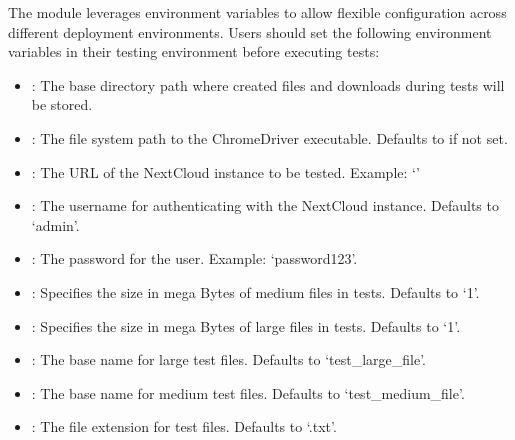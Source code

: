 \documentclass[letterpaper,10pt,english]{sphinxmanual}
\begin{document}
\begin{description}
\sphinxAtStartPar
The module leverages environment variables to allow flexible configuration across different deployment environments.
Users should set the following environment variables in their testing environment before executing tests:
\begin{itemize}
\item {} 
\sphinxAtStartPar
{}: The base directory path where created files and downloads during tests will be stored.

\item {} 
\sphinxAtStartPar
{}: The file system path to the ChromeDriver executable. Defaults to  if not set.

\item {} 
\sphinxAtStartPar
{}: The URL of the NextCloud instance to be tested. Example: ‘’

\item {} 
\sphinxAtStartPar
{}: The username for authenticating with the NextCloud instance. Defaults to ‘admin’.

\item {} 
\sphinxAtStartPar
{}: The password for the user. Example: ‘password123’.

\item {} 
\sphinxAtStartPar
{}: Specifies the size in mega Bytes of medium files in tests. Defaults to ‘1’.

\item {} 
\sphinxAtStartPar
{}: Specifies the size in mega Bytes of large files in tests. Defaults to ‘1’.

\item {} 
\sphinxAtStartPar
{}: The base name for large test files. Defaults to ‘test\_large\_file’.

\item {} 
\sphinxAtStartPar
{}: The base name for medium test files. Defaults to ‘test\_medium\_file’.

\item {} 
\sphinxAtStartPar
{}: The file extension for test files. Defaults to ‘.txt’.

\end{itemize}

\end{description}
\end{document}
